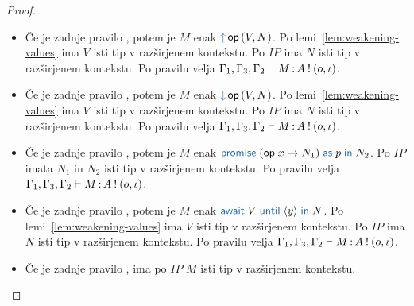 \begin{proof}
\begin{itemize}
		\item Če je zadnje pravilo , potem je $M$ enak $\tmopout{op}{V}{N}$.
		Po lemi~\ref{lem:weakening-values} ima $V$ isti tip v razširjenem kontekstu.
		Po $IP$ ima $N$ isti tip v razširjenem kontekstu.
		Po pravilu  velja $\Gamma_1, \Gamma_3, \Gamma_2 \vdash M \mathinner{:} A \mathbin{!} (o, \iota)$.
		
		\item Če je zadnje pravilo , potem je $M$ enak $\tmopin{op}{V}{N}$.
		Po lemi~\ref{lem:weakening-values} ima $V$ isti tip v razširjenem kontekstu.
		Po $IP$ ima $N$ isti tip v razširjenem kontekstu.
		Po pravilu  velja $\Gamma_1, \Gamma_3, \Gamma_2 \vdash M \mathinner{:} A \mathbin{!} (o, \iota)$.
		
		\item Če je zadnje pravilo , potem je $M$ enak $\tmwith{op}{x}{N_1}{p}{N_2}$.
		Po $IP$ imata $N_1$ in $N_2$ isti tip v razširjenem kontekstu.
		Po pravilu  velja $\Gamma_1, \Gamma_3, \Gamma_2 \vdash M \mathinner{:} A \mathbin{!} (o, \iota)$.
		
		\item Če je zadnje pravilo , potem je $M$ enak $\tmawait{V}{y}{N}$.
		Po lemi~\ref{lem:weakening-values} ima $V$ isti tip v razširjenem kontekstu.
		Po $IP$ ima $N$ isti tip v razširjenem kontekstu.
		Po pravilu  velja $\Gamma_1, \Gamma_3, \Gamma_2 \vdash M \mathinner{:} A \mathbin{!} (o, \iota)$.
		
		\item Če je zadnje pravilo , ima po $IP$ $M$ isti tip v razširjenem kontekstu.
		
	\end{itemize}
\end{proof}

